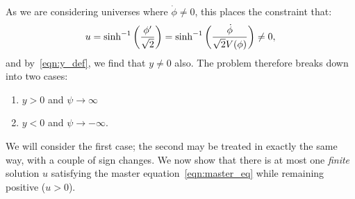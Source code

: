 As we are considering universes where $\dot{\phi}\ne 0$, this places the constraint that:
%
\begin{equation}
  u 
  = 
  \sinh^{-1}\left(\frac{{{\phi}^\prime}}{\sqrt 2}\right) 
  = 
  \sinh^{-1}\left(\frac{\dot\phi}{\sqrt 2 V(\phi)}\right)
  \ne 
  0,
\end{equation}
%
and by~\eqref{eqn:y_def}, we find that $y\ne0$ also.  The problem therefore breaks down into two cases: 
%
\begin{enumerate}
  \item $y>0$ and $\psi\rightarrow\infty$
  \item $y<0$ and $\psi\rightarrow -\infty$.
\end{enumerate}
%
We will consider the first case; the second may be treated in exactly the same way, with a couple of sign changes.  We now show that there is at most one {\em finite\/} solution $u$ satisfying the master equation~\eqref{eqn:master_eq} while remaining positive ($u>0$).

